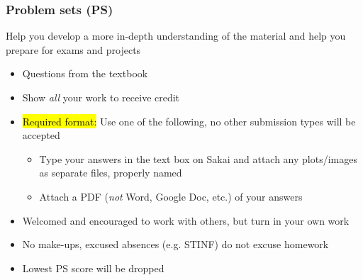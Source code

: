 \documentclass[11pt,containsverbatim,handout,xcolor=xelatex,dvipsnames,table]{beamer}
\begin{document}

\begin{frame}
\frametitle{Problem sets (PS)}

 Help you develop a more in-depth understanding of the material and help you prepare for exams and projects

\begin{itemize}

\item Questions from the textbook

\item Show \emph{all} your work to receive credit

\item \hl{Required format:} Use one of the following, no other submission types will be accepted
\begin{itemize}
\item Type your answers in the text box on Sakai and attach any plots/images as separate files, properly named
\item Attach a PDF (\emph{not} Word, Google Doc, etc.) of your answers
\end{itemize}

\item Welcomed and encouraged to work with others, but turn in your own work

\item No make-ups, excused absences (e.g. STINF) do not excuse homework

\item Lowest PS score will be dropped

\end{itemize}

\end{frame}

\end{document}
